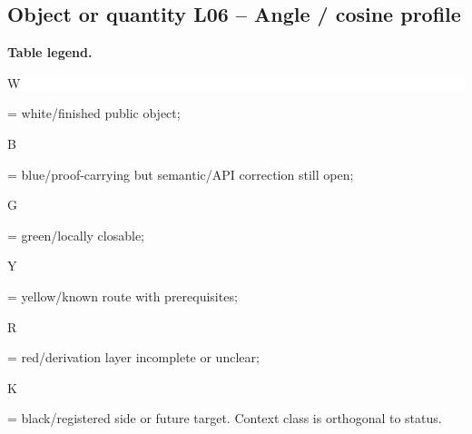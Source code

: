 \subsection*{Object or quantity L06 -- Angle /\allowbreak{} cosine profile}
\hypertarget{objproof:L06}{}
\par\smallskip\noindent\begin{minipage}{0.99\linewidth}\footnotesize\raggedright\textbf{Table legend.} \colorbox{white}{\strut W} = white/finished public object; \colorbox{cyan!20}{\strut B} = blue/proof-carrying but semantic/API correction still open; \colorbox{green!18}{\strut G} = green/locally closable; \colorbox{yellow!25}{\strut Y} = yellow/known route with prerequisites; \colorbox{red!20}{\strut R} = red/derivation layer incomplete or unclear; \colorbox{black!18}{\strut K} = black/registered side or future target. Context class is orthogonal to status.\end{minipage}\par\vspace{0.25em}
